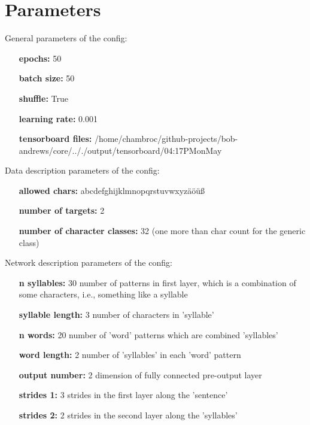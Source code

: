 \documentclass[a4paper,10pt,twoside]{article}
\begin{document}
 
\section{Parameters}

        General parameters of the config:
        

        \begin{itemize}
        \item[{\bf epochs:}] 50
        \item[{\bf batch size:}] 50
        \item[{\bf shuffle:}] True
        \item[{\bf learning rate:}] 0.001
        \item[{\bf tensorboard files:}] /home/chambroc/github-projects/bob-andrews/core/.././output/tensorboard/04:17PM\textunderscore on\textunderscore May
        \end{itemize}
        

        
        Data description parameters of the config:
        

        \begin{itemize}
        \item[{\bf allowed chars:}] abcdefghijklmnopqrstuvwxyzäöüß 
        \item[{\bf number of targets:}] 2
        \item[{\bf number of character classes:}] 32 (one more than char count for the generic class)
        \end{itemize}
        

        
        Network description parameters of the config:
        

        \begin{itemize}
        \item[{\bf n syllables:}] 30 number of patterns in first layer, which is a combination of some characters, i.e., something like a syllable
        \item[{\bf syllable length:}] 3 number of characters in 'syllable'
        \item[{\bf n words:}] 20 number of 'word' patterns which are combined 'syllables'
        \item[{\bf word length:}] 2 number of 'syllables' in each 'word' pattern
        \item[{\bf output number:}] 2 dimension of fully connected pre-output layer
        \item[{\bf strides 1:}] 3 strides in the first layer along the 'sentence'
        \item[{\bf strides 2:}] 2 strides in the second layer along the 'syllables'
        \end{itemize}
        
\end{document}
